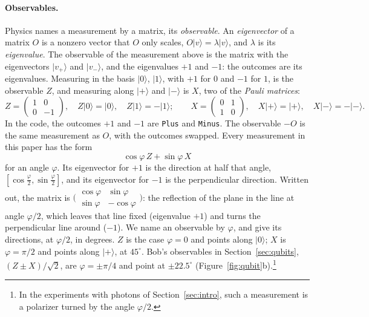 \documentclass[11pt]{article}
\newcommand{\hs}{\lstinline[style=hask,basicstyle=\ttfamily,frame=none]}
\begin{document}
\paragraph{Observables.} Physics names a measurement by a matrix, its \emph{observable}. An \emph{eigenvector} of a matrix $O$ is a nonzero vector that $O$ only scales, $O|v\rangle = \lambda|v\rangle$, and $\lambda$ is its \emph{eigenvalue}. The observable of the measurement above is the matrix with the eigenvectors $|v_+\rangle$ and $|v_-\rangle$, and the eigenvalues $+1$ and $-1$: the outcomes are its eigenvalues. Measuring in the basis $|0\rangle$, $|1\rangle$, with $+1$ for $0$ and $-1$ for $1$, is the observable $Z$, and measuring along $|{+}\rangle$ and $|{-}\rangle$ is $X$, two of the \emph{Pauli matrices}:
\[
  Z = \begin{pmatrix} 1 & 0 \\ 0 & -1 \end{pmatrix}, \quad Z|0\rangle = |0\rangle, \quad Z|1\rangle = -|1\rangle; \qquad
  X = \begin{pmatrix} 0 & 1 \\ 1 & 0 \end{pmatrix}, \quad X|{+}\rangle = |{+}\rangle, \quad X|{-}\rangle = -|{-}\rangle.
\]
In the code, the outcomes $+1$ and $-1$ are \hs|Plus| and \hs|Minus|. The observable $-O$ is the same measurement as $O$, with the outcomes swapped. Every measurement in this paper has the form
\[
  \cos\varphi\, Z + \sin\varphi\, X
\]
for an angle $\varphi$. Its eigenvector for $+1$ is the direction at half that angle, $[\cos\frac\varphi2, \sin\frac\varphi2]$, and its eigenvector for $-1$ is the perpendicular direction. Written out, the matrix is $\bigl(\begin{smallmatrix} \cos\varphi & \sin\varphi \\ \sin\varphi & -\cos\varphi \end{smallmatrix}\bigr)$: the reflection of the plane in the line at angle $\varphi/2$, which leaves that line fixed (eigenvalue $+1$) and turns the perpendicular line around ($-1$). We name an observable by $\varphi$, and give its directions, at $\varphi/2$, in degrees. $Z$ is the case $\varphi = 0$ and points along $|0\rangle$; $X$ is $\varphi = \pi/2$ and points along $|{+}\rangle$, at $45^\circ$. Bob's observables in Section~\ref{sec:qubits}, $(Z \pm X)/\sqrt2$, are $\varphi = \pm\pi/4$ and point at $\pm 22.5^\circ$ (Figure~\ref{fig:qubit}b).\footnote{In the experiments with photons of Section~\ref{sec:intro}, such a measurement is a polarizer turned by the angle $\varphi/2$.}
\end{document}
